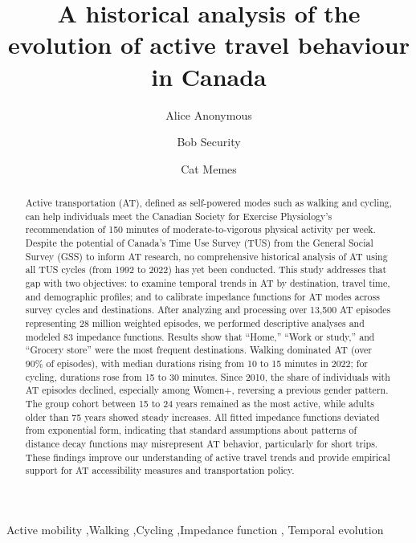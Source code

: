 \documentclass[preprint, 3p,
authoryear]{elsarticle} %
\begin{document}
\begin{frontmatter}

  \title{A historical analysis of the evolution of active travel
behaviour in Canada}
    \author[Some Institute of Technology]{Alice Anonymous%
  }
    \author[Some Institute of Technology]{Bob Security%
  }
    \author[Some Institute of Technology]{Cat Memes%
  }
  
  \begin{abstract}
  Active transportation (AT), defined as self-powered modes such as
  walking and cycling, can help individuals meet the Canadian Society
  for Exercise Physiology's recommendation of 150 minutes of
  moderate-to-vigorous physical activity per week. Despite the potential
  of Canada's Time Use Survey (TUS) from the General Social Survey (GSS)
  to inform AT research, no comprehensive historical analysis of AT
  using all TUS cycles (from 1992 to 2022) has yet been conducted. This
  study addresses that gap with two objectives: to examine temporal
  trends in AT by destination, travel time, and demographic profiles;
  and to calibrate impedance functions for AT modes across survey cycles
  and destinations. After analyzing and processing over 13,500 AT
  episodes representing 28 million weighted episodes, we performed
  descriptive analyses and modeled 83 impedance functions. Results show
  that ``Home,'' ``Work or study,'' and ``Grocery store'' were the most
  frequent destinations. Walking dominated AT (over 90\% of episodes),
  with median durations rising from 10 to 15 minutes in 2022; for
  cycling, durations rose from 15 to 30 minutes. Since 2010, the share
  of individuals with AT episodes declined, especially among Women+,
  reversing a previous gender pattern. The group cohort between 15 to 24
  years remained as the most active, while adults older than 75 years
  showed steady increases. All fitted impedance functions deviated from
  exponential form, indicating that standard assumptions about patterns
  of distance decay functions may misrepresent AT behavior, particularly
  for short trips. These findings improve our understanding of active
  travel trends and provide empirical support for AT accessibility
  measures and transportation policy.
  \end{abstract}
    \begin{keyword}
    Active mobility \sep Walking \sep Cycling \sep Impedance
function \sep 
    Temporal evolution
  \end{keyword}
  
 \end{frontmatter}
\end{document}

